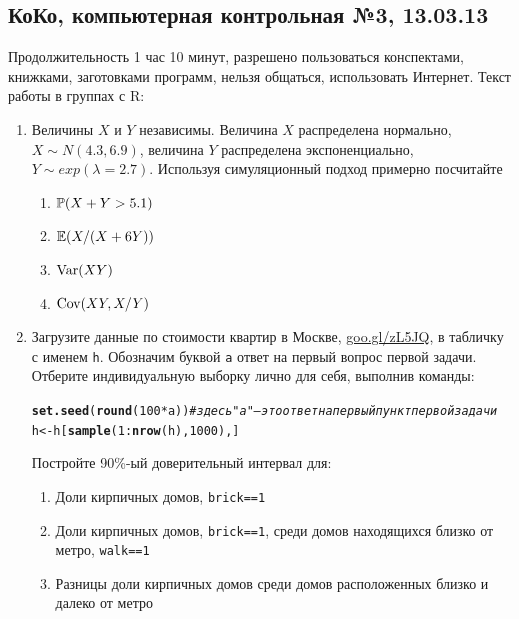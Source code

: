 \documentclass[12pt, a4paper]{article}\usepackage[]{graphicx}\usepackage[]{color}
\makeatletter
\newcommand{\hlnum}[1]{\textcolor[rgb]{0.686,0.059,0.569}{#1}}%
\newcommand{\hlcom}[1]{\textcolor[rgb]{0.678,0.584,0.686}{\textit{#1}}}%
\newcommand{\hlopt}[1]{\textcolor[rgb]{0,0,0}{#1}}%
\newcommand{\hlstd}[1]{\textcolor[rgb]{0.345,0.345,0.345}{#1}}%
\newcommand{\hlkwb}[1]{\textcolor[rgb]{0.69,0.353,0.396}{#1}}%
\newcommand{\hlkwd}[1]{\textcolor[rgb]{0.737,0.353,0.396}{\textbf{#1}}}%
\newenvironment{kframe}{%
 \def\at@end@of@kframe{}%
 \ifinner\ifhmode%
  \def\at@end@of@kframe{\end{minipage}}%
  \begin{minipage}{\columnwidth}%
 \fi\fi%
 \def\FrameCommand##1{\hskip\@totalleftmargin \hskip-\fboxsep
 \colorbox{shadecolor}{##1}\hskip-\fboxsep
     \hskip-\linewidth \hskip-\@totalleftmargin \hskip\columnwidth}%
 \MakeFramed {\advance\hsize-\width
   \@totalleftmargin\z@ \linewidth\hsize
   \@setminipage}}%
 {\par\unskip\endMakeFramed%
 \at@end@of@kframe}
\newenvironment{knitrout}{}{} %
\makeatother
\begin{document}
\subsection{КоКо, компьютерная контрольная №3, 13.03.13}

Продолжительность 1 час 10 минут, разрешено пользоваться конспектами, книжками, заготовками программ, нельзя общаться, использовать Интернет. Текст работы в группах с R:

\begin{enumerate}
\item Величины $X$ и $Y$ независимы. Величина $X$ распределена нормально, $X\sim N(4.3,6.9)$, величина $Y$ распределена экспоненциально, $Y\sim exp(\lambda=2.7)$. Используя симуляционный подход примерно посчитайте

\begin{enumerate}
\item $\P(X+Y>5.1)$
\item $\E(X/(X+6Y))$
\item $\Var(XY)$
\item $\Cov(XY,X/Y)$
\end{enumerate}

\item Загрузите данные по стоимости квартир в Москве, \href{http://goo.gl/zL5JQ}{goo.gl/zL5JQ}, в табличку с именем \verb|h|. Обозначим буквой \verb|a| ответ на первый вопрос первой задачи. Отберите индивидуальную выборку лично для себя, выполнив команды:
\begin{knitrout}
\color{fgcolor}\begin{kframe}
\begin{alltt}
\hlkwd{set.seed}\hlstd{(}\hlkwd{round}\hlstd{(}\hlnum{100} \hlopt{*} \hlstd{a))} \hlcom{# здесь "a" — это ответ на первый пункт первой задачи}
\hlstd{h} \hlkwb{<-} \hlstd{h[}\hlkwd{sample}\hlstd{(}\hlnum{1}\hlopt{:}\hlkwd{nrow}\hlstd{(h),} \hlnum{1000}\hlstd{), ]}
\end{alltt}
\end{kframe}
\end{knitrout}

Постройте 90\%-ый доверительный интервал для:
\begin{enumerate}
\item Доли кирпичных домов, \verb|brick==1|
\item Доли кирпичных домов, \verb|brick==1|, среди домов находящихся близко от метро,  \verb|walk==1|
\item Разницы доли кирпичных домов среди домов расположенных близко и далеко от метро
\end{enumerate}



\end{enumerate}
\end{document}
